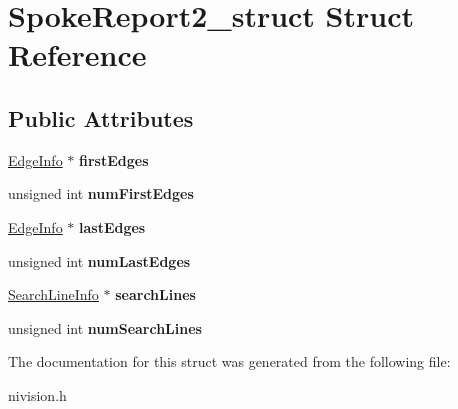 \hypertarget{structSpokeReport2__struct}{\section{\-Spoke\-Report2\-\_\-struct \-Struct \-Reference}
\label{structSpokeReport2__struct}
}
\subsection*{\-Public \-Attributes}
\begin{DoxyCompactItemize}
\item 
\hypertarget{structSpokeReport2__struct_a856bf76e1fdfa54ea07133efd67e42c0}{\hyperlink{structEdgeInfo__struct}{\-Edge\-Info} $\ast$ {\bfseries first\-Edges}}\label{structSpokeReport2__struct_a856bf76e1fdfa54ea07133efd67e42c0}

\item 
\hypertarget{structSpokeReport2__struct_a37e14d096657e9e89c8089829c311d59}{unsigned int {\bfseries num\-First\-Edges}}\label{structSpokeReport2__struct_a37e14d096657e9e89c8089829c311d59}

\item 
\hypertarget{structSpokeReport2__struct_a30a1c103d8919f6f630d12ff40b50e8a}{\hyperlink{structEdgeInfo__struct}{\-Edge\-Info} $\ast$ {\bfseries last\-Edges}}\label{structSpokeReport2__struct_a30a1c103d8919f6f630d12ff40b50e8a}

\item 
\hypertarget{structSpokeReport2__struct_a5f65269e1e3bd9482d36da7f92bcb025}{unsigned int {\bfseries num\-Last\-Edges}}\label{structSpokeReport2__struct_a5f65269e1e3bd9482d36da7f92bcb025}

\item 
\hypertarget{structSpokeReport2__struct_acc2432884795e230a4f1325a813a8ae8}{\hyperlink{structSearchLineInfo__struct}{\-Search\-Line\-Info} $\ast$ {\bfseries search\-Lines}}\label{structSpokeReport2__struct_acc2432884795e230a4f1325a813a8ae8}

\item 
\hypertarget{structSpokeReport2__struct_ac696a0130a89333db098195eb5f305bc}{unsigned int {\bfseries num\-Search\-Lines}}\label{structSpokeReport2__struct_ac696a0130a89333db098195eb5f305bc}

\end{DoxyCompactItemize}


\-The documentation for this struct was generated from the following file\-:\begin{DoxyCompactItemize}
\item 
nivision.\-h\end{DoxyCompactItemize}
